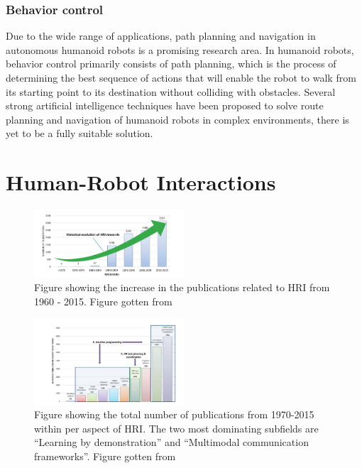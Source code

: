 \documentclass[conference]{IEEEtran}
\begin{document}
\subsubsection{Behavior control}
Due to the wide range of applications, path planning and navigation in autonomous humanoid robots is a promising research area. In humanoid robots, behavior control primarily consists of path planning, which is the process of determining the best sequence of actions that will enable the robot to walk from its starting point to its destination without colliding with obstacles. Several strong artificial intelligence techniques have been proposed to solve route planning and navigation of humanoid robots in complex environments, there is yet to be a fully suitable solution.

\section{Human-Robot Interactions}
\begin{figure}[h]
    \centerline{\includegraphics[width=0.5\textwidth]{images/evolution_of_hri.png}}
    \caption{Figure showing the increase in the publications related to HRI from 1960 - 2015. Figure gotten from\autocite{tsarouchi2016human}}
\label{fig1}
\end{figure}

\begin{figure}[h]
    \centerline{\includegraphics[width=0.5\textwidth]{images/hri_total_number_of_publication.png}}
    \caption{Figure showing the total number of publications from 1970-2015 within per aspect of HRI. The two most dominating subfields are ``Learning by demonstration'' and ``Multimodal communication frameworks''. Figure gotten from \autocite{tsarouchi2016human}}
\label{fig2}
\end{figure}
\end{document}
